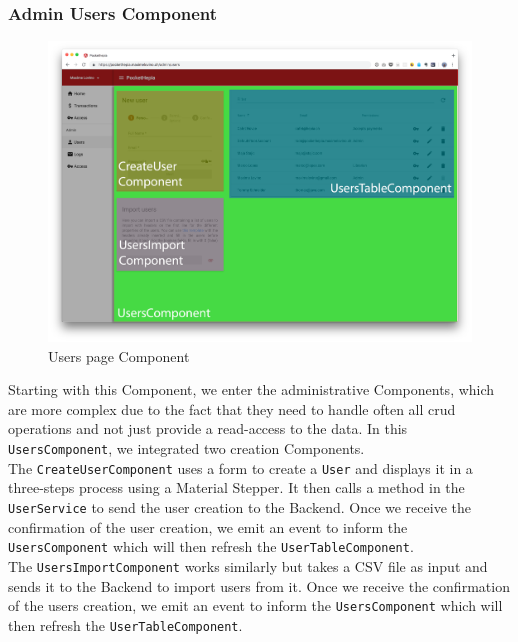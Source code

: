 \documentclass[twoside, openright,11pt,a4paper]{book}
\begin{document}
\subsubsection{Admin Users Component}
\begin{figure}[H]
\begin{center}
	\includegraphics[width=\textwidth]{assets/screens/angular/users}
	\caption{Users page Component}
			\label{users_screen}
\end{center}
\end{figure}
Starting with this Component, we enter the administrative Components, which are more complex due to the fact that they need to handle often all \gls{crud} operations and not just provide a read-access to the data. In this \verb+UsersComponent+, we integrated two creation Components. \\

The \verb+CreateUserComponent+ uses a form to create a \verb+User+ and displays it in a three-steps process using a Material Stepper\cite{angular:material:component:stepper}. It then calls a method in the \verb+UserService+ to send the user creation to the Backend. Once we receive the confirmation of the user creation, we emit an event to inform the \verb+UsersComponent+ which will then refresh the \verb+UserTableComponent+.\\

The \verb+UsersImportComponent+ works similarly but takes a CSV file as input and sends it to the Backend to import users from it. Once we receive the confirmation of the users creation, we emit an event to inform the \verb+UsersComponent+ which will then refresh the \verb+UserTableComponent+.\\
\end{document}
